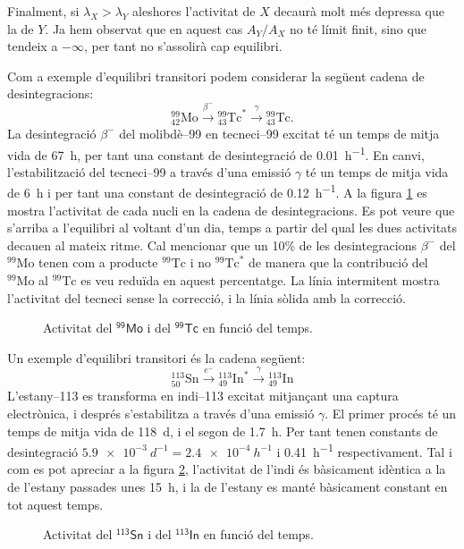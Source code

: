 \documentclass[12pt]{article}
\begin{document}
Finalment, si \( \lambda_X > \lambda_Y \) aleshores l'activitat de \( X \) decaurà molt més depressa que la de \( Y \). Ja hem observat que en aquest cas \( A_Y/A_X \) no té límit finit, sino que tendeix a \( -\infty \), per tant no s'assolirà cap equilibri. 

Com a exemple d'equilibri transitori podem considerar la següent cadena de desintegracions:
\begin{equation*}
	{}_{42}^{99} \mathrm{Mo} \xrightarrow{\beta^-} {}_{43}^{99} \mathrm{Tc}^{\ast} \xrightarrow{\gamma} {}_{43}^{99} \mathrm{Tc}.
\end{equation*}
La desintegració \( \beta^- \) del molibdè--99 en tecneci--99 excitat té un temps de mitja vida de \SI{67}{h}, per tant una constant de desintegració de \SI{0.01}{h^{-1}}. En canvi, l'estabilització del tecneci--99 a través d'una emissió \( \gamma \) té un temps de mitja vida de \SI{6}{h} i per tant una constant de desintegració de \SI{0.12}{h^{-1}}. A la figura \ref{fig:equilibri transitori} es mostra l'activitat de cada nucli en la cadena de desintegracions. Es pot veure que s'arriba a l'equilibri al voltant d'un dia, temps a partir del qual les dues activitats decauen al mateix ritme. Cal mencionar que un \num{10}\% de les desintegracions \( \beta^- \) del \( {}^{99}\text{Mo} \) tenen com a producte \( {}^{99}\text{Tc} \) i no \( {}^{99}\text{Tc}^{\ast} \) de manera que la contribució del \(  {}^{99}\text{Mo} \) al \( {}^{99}\text{Tc} \) es veu reduïda en aquest percentatge. La línia intermitent mostra l'activitat del tecneci sense la correcció, i la línia sòlida amb la correcció.
\begin{figure}
	\center
	
	\caption{Activitat del \( \mathsf{{}^{99}\text{Mo}} \) i del \( \mathsf{{}^{99}\text{Tc}} \) en funció del temps.}
	\label{fig:equilibri transitori}
\end{figure}

Un exemple d'equilibri transitori és la cadena següent:
\begin{equation*}
	{}^{113}_{50}\text{Sn} \xrightarrow{e^-} {}^{113}_{49}\text{In}^{\ast} \xrightarrow{\gamma} {}^{113}_{49}\text{In}
\end{equation*}
L'estany--113 es transforma en indi--113 excitat mitjançant una captura electrònica, i després s'estabilitza a través d'una emissió \( \gamma \). El primer procés té un temps de mitja vida de \SI{118}{d}, i el segon de \SI{1.7}{h}. Per tant tenen constants de desintegració \( \SI{5.9e-3}{d^{-1}} = \SI{2.4e-4}{h^{-1}} \) i \SI{0.41}{h^{-1}} respectivament. Tal i com es pot apreciar a la figura \ref{fig:equilibri secular}, l'activitat de l'indi és bàsicament idèntica a la de l'estany passades unes \SI{15}{h}, i la de l'estany es manté bàsicament constant en tot aquest temps. 
\begin{figure}
	\center
	
	\caption{Activitat del \( \mathsf{{}^{113}\text{Sn}} \) i del \( \mathsf{{}^{113}\text{In}} \) en funció del temps.}
	\label{fig:equilibri secular}
\end{figure}
\end{document}
